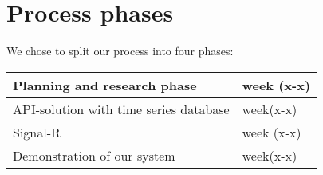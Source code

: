 \section{Process phases}

We chose to split our process into four phases:

\begin{tabular}{|l | l|}
\hline 
Planning and research phase & week (x-x) \\
\hline

API-solution with time series database & week(x-x) \\

\hline
Signal-R & week (x-x) \\
\hline
Demonstration of our system & week(x-x) \\
\hline
\end{tabular}